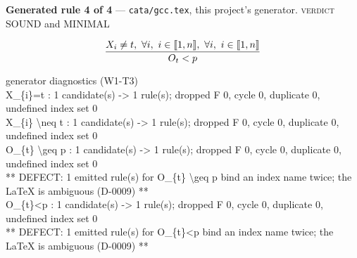 \documentclass[10pt,a4paper]{article}
\newcommand{\diag}[1]{{\small\itshape\raggedright #1\par}}
\newcommand{\rulebox}[1]{%
  \[\resizebox{\ifdim\width>\linewidth\linewidth\else\width\fi}{!}%
    {$\displaystyle #1$}\]}
\begin{document}
{\small\textbf{Generated rule 4 of 4} --- \texttt{cata/gcc.tex}, this project's generator. \textsc{verdict} SOUND and MINIMAL\par}
\rulebox{\frac{X_{i} \neq t,~\forall i,~i \in \llbracket1,n\rrbracket,~\forall i,~i \in \llbracket1,n\rrbracket}{O_{t}<p}}

\diag{generator diagnostics (W1-T3)\\{} X\_\{i\}=t : 1 candidate(s) -> 1 rule(s); dropped F 0, cycle 0, duplicate 0, undefined index set 0\\{} X\_\{i\} \textbackslash{}neq t : 1 candidate(s) -> 1 rule(s); dropped F 0, cycle 0, duplicate 0, undefined index set 0\\{} O\_\{t\} \textbackslash{}geq p : 1 candidate(s) -> 1 rule(s); dropped F 0, cycle 0, duplicate 0, undefined index set 0\\{}   ** DEFECT: 1 emitted rule(s) for O\_\{t\} \textbackslash{}geq p bind an index name twice; the LaTeX is ambiguous (D-0009) **\\{} O\_\{t\}<p : 1 candidate(s) -> 1 rule(s); dropped F 0, cycle 0, duplicate 0, undefined index set 0\\{}   ** DEFECT: 1 emitted rule(s) for O\_\{t\}<p bind an index name twice; the LaTeX is ambiguous (D-0009) **}
\end{document}
